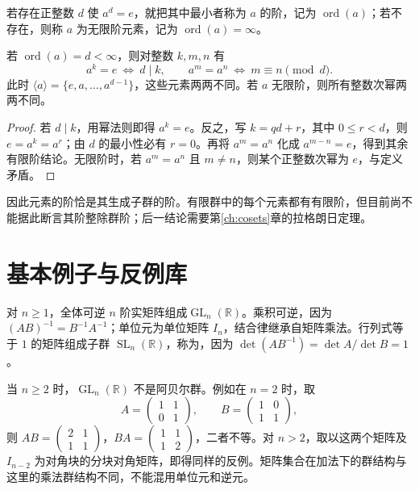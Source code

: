 \documentclass[UTF8,12pt,a4paper,fontset=fandol]{ctexbook}
\begin{document}
\begin{definition}[元素的阶]
若存在正整数 $d$ 使 $a^d=e$，就把其中最小者称为 $a$ 的阶，记为 $\operatorname{ord}(a)$；若不存在，则称 $a$ 为无限阶元素，记为 $\operatorname{ord}(a)=\infty$。
\end{definition}

\begin{proposition}[幂相等的判别]\label{prop:order-divisibility}
若 $\operatorname{ord}(a)=d<\infty$，则对整数 $k,m,n$ 有
\[
  a^k=e\ \Longleftrightarrow\ d\mid k,\qquad
  a^m=a^n\ \Longleftrightarrow\ m\equiv n\pmod d.
\]
此时 $\langle a\rangle=\{e,a,\ldots,a^{d-1}\}$，这些元素两两不同。若 $a$ 无限阶，则所有整数次幂两两不同。
\end{proposition}
\begin{proof}
若 $d\mid k$，用幂法则即得 $a^k=e$。反之，写 $k=qd+r$，其中 $0\leq r<d$，则 $e=a^k=a^r$；由 $d$ 的最小性必有 $r=0$。再将 $a^m=a^n$ 化成 $a^{m-n}=e$，得到其余有限阶结论。无限阶时，若 $a^m=a^n$ 且 $m\ne n$，则某个正整数次幂为 $e$，与定义矛盾。
\end{proof}

因此元素的阶恰是其生成子群的阶。有限群中的每个元素都有有限阶，但目前尚不能据此断言其阶整除群阶；后一结论需要第\ref{ch:cosets}章的拉格朗日定理。

\section{基本例子与反例库}\label{sec:basic-group-examples}

\begin{example}[矩阵群]
对 $n\geq1$，全体可逆 $n$ 阶实矩阵组成$\operatorname{GL}_n(\mathbb R)$。乘积可逆，因为 $(AB)^{-1}=B^{-1}A^{-1}$；单位元为单位矩阵 $I_n$，结合律继承自矩阵乘法。行列式等于 $1$ 的矩阵组成子群 $\operatorname{SL}_n(\mathbb R)$，称为，因为 $\det(AB^{-1})=\det A/\det B=1$。
\end{example}

当 $n\geq2$ 时，$\operatorname{GL}_n(\mathbb R)$ 不是阿贝尔群。例如在 $n=2$ 时，取
\[
  A=\begin{pmatrix}1&1\\0&1\end{pmatrix},\qquad
  B=\begin{pmatrix}1&0\\1&1\end{pmatrix},
\]
则 $AB=\left(\begin{smallmatrix}2&1\\1&1\end{smallmatrix}\right)$，$BA=\left(\begin{smallmatrix}1&1\\1&2\end{smallmatrix}\right)$，二者不等。对 $n>2$，取以这两个矩阵及 $I_{n-2}$ 为对角块的分块对角矩阵，即得同样的反例。矩阵集合在加法下的群结构与这里的乘法群结构不同，不能混用单位元和逆元。
\end{document}
